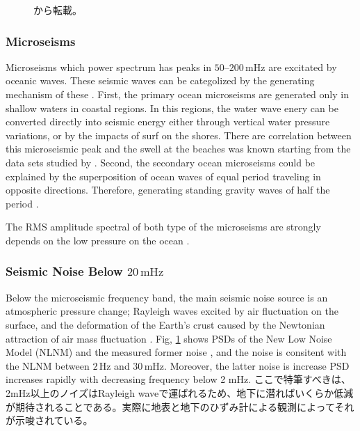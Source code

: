 \begin{figure}[p]
\begin{center}
    \caption{\cite{nishida2002origin}から転載。
    }\label{img:img325}
  \end{center} 
\end{figure}


\subsubsection{Microseisms}
Microseisms which power spectrum has peaks in $50$--$200\,\mathrm{mHz}$ are excitated by oceanic waves. These seismic waves can be categolized by the generating mechanism of these \cite{Bormann2012new}. First, the primary ocean microseisms are generated only in shallow waters in coastal regions. In this regions, the water wave enery can be converted directly into seismic energy either through vertical water pressure variations, or by the impacts of surf on the shores. There are correlation between this microseismic peak and the swell at the beaches was known starting from the data sets studied by \cite{haubrich1963comparative}. Second, the secondary ocean microseisms could be explained by the superposition of ocean waves of equal period traveling in opposite directions. Therefore, generating standing gravity waves of half the period \cite{longuet1950theory}.

The RMS amplitude spectral of both type of the microseisms are strongly depends on the low pressure on the ocean \cite{naticchioni2014microseismic}.

\subsubsection{Seismic Noise Below $20\,\mathrm{mHz}$}
Below the microseismic frequency band, the main seismic noise source is an atmospheric pressure change; Rayleigh waves excited by air fluctuation on the surface, and the deformation of the Earth's crust caused by the Newtonian attraction of air mass fluctuation \cite{sorrells1971earth,zurn1995noise}. Fig, \ref{img:img325} shows PSDs of the New Low Noise Model (NLNM) \cite{peterson1993observations} and the measured former noise \cite{nishida2002origin}, and the noise is consitent with the NLNM between $2\,\mathrm{Hz}$ and $30\,\mathrm{mHz}$. Moreover, the latter noise is increase PSD increases rapidly with decreasing frequency below 2 mHz. ここで特筆すべきは、2mHz以上のノイズはRayleigh waveで運ばれるため、地下に潜ればいくらか低減が期待されることである。実際に地表と地下のひずみ計による観測によってそれが示唆されている\cite{araya2007broadband}。

